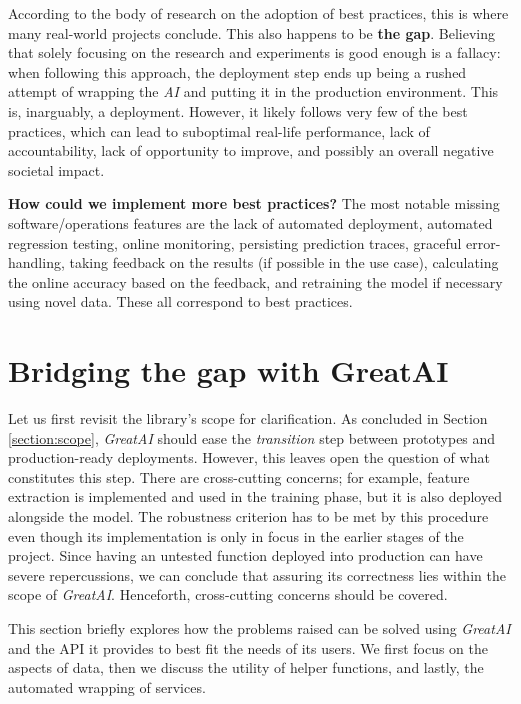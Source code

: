 According to the body of research on the adoption of best practices, this is where many real-world projects conclude. This also happens to be \textbf{the gap}. Believing that solely focusing on the research and experiments is good enough is a fallacy: when following this approach, the deployment step ends up being a rushed attempt of wrapping the \textit{AI} and putting it in the production environment. This is, inarguably, a deployment. However, it likely follows very few of the best practices, which can lead to suboptimal real-life performance, lack of accountability, lack of opportunity to improve, and possibly an overall negative societal impact.

\begin{displayquote}
\textbf{How could we implement more best practices?} The most notable missing software/operations features are the lack of automated deployment, automated regression testing, online monitoring, persisting prediction traces, graceful error-handling, taking feedback on the results (if possible in the use case), calculating the online accuracy based on the feedback, and retraining the model if necessary using novel data. These all correspond to best practices.
\end{displayquote}

\section{Bridging the gap with GreatAI}

Let us first revisit the library's scope for clarification. As concluded in Section \ref{section:scope}, \textit{GreatAI} should ease the \textit{transition} step between prototypes and production-ready deployments. However, this leaves open the question of what constitutes this step. There are cross-cutting concerns; for example, feature extraction is implemented and used in the training phase, but it is also deployed alongside the model. The robustness criterion has to be met by this procedure even though its implementation is only in focus in the earlier stages of the project. Since having an untested function deployed into production can have severe repercussions, we can conclude that assuring its correctness lies within the scope of \textit{GreatAI}. Henceforth, cross-cutting concerns should be covered.

This section briefly explores how the problems raised can be solved using \textit{GreatAI} and the API it provides to best fit the needs of its users. We first focus on the aspects of data, then we discuss the utility of helper functions, and lastly, the automated wrapping of services.

